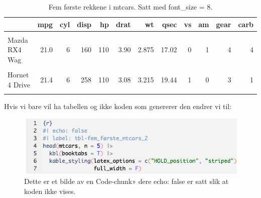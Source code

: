 \documentclass[
  letterpaper,
  DIV=11,
  numbers=noendperiod]{scrartcl}
\begin{document}
\hypertarget{tbl-fem_fuxf8rste_mtcars}{}
\begin{table}[H]
\caption{\label{tbl-fem_første_mtcars}Fem første rekkene i mtcars. Satt med font\_size = 8. }\tabularnewline

\centering\begingroup\fontsize{8}{10}\selectfont

\begin{tabular}[t]{lrrrrrrrrrrr}
\toprule
  & mpg & cyl & disp & hp & drat & wt & qsec & vs & am & gear & carb\\
\midrule
\cellcolor{gray!6}{Mazda RX4} & \cellcolor{gray!6}{21.0} & \cellcolor{gray!6}{6} & \cellcolor{gray!6}{160} & \cellcolor{gray!6}{110} & \cellcolor{gray!6}{3.90} & \cellcolor{gray!6}{2.620} & \cellcolor{gray!6}{16.46} & \cellcolor{gray!6}{0} & \cellcolor{gray!6}{1} & \cellcolor{gray!6}{4} & \cellcolor{gray!6}{4}\\
Mazda RX4 Wag & 21.0 & 6 & 160 & 110 & 3.90 & 2.875 & 17.02 & 0 & 1 & 4 & 4\\
\cellcolor{gray!6}{Datsun 710} & \cellcolor{gray!6}{22.8} & \cellcolor{gray!6}{4} & \cellcolor{gray!6}{108} & \cellcolor{gray!6}{93} & \cellcolor{gray!6}{3.85} & \cellcolor{gray!6}{2.320} & \cellcolor{gray!6}{18.61} & \cellcolor{gray!6}{1} & \cellcolor{gray!6}{1} & \cellcolor{gray!6}{4} & \cellcolor{gray!6}{1}\\
Hornet 4 Drive & 21.4 & 6 & 258 & 110 & 3.08 & 3.215 & 19.44 & 1 & 0 & 3 & 1\\
\cellcolor{gray!6}{Hornet Sportabout} & \cellcolor{gray!6}{18.7} & \cellcolor{gray!6}{8} & \cellcolor{gray!6}{360} & \cellcolor{gray!6}{175} & \cellcolor{gray!6}{3.15} & \cellcolor{gray!6}{3.440} & \cellcolor{gray!6}{17.02} & \cellcolor{gray!6}{0} & \cellcolor{gray!6}{0} & \cellcolor{gray!6}{3} & \cellcolor{gray!6}{2}\\
\bottomrule
\end{tabular}
\endgroup{}
\end{table}

Hvis vi bare vil ha tabellen og ikke koden som genererer den endrer vi
til:

\begin{figure}

{\centering \includegraphics{echo-false.png}

}

\caption{\label{fig-echo_false}Dette er et bilde av en Code-chunk» dere
echo: false er satt slik at koden ikke vises.}

\end{figure}
\end{document}
